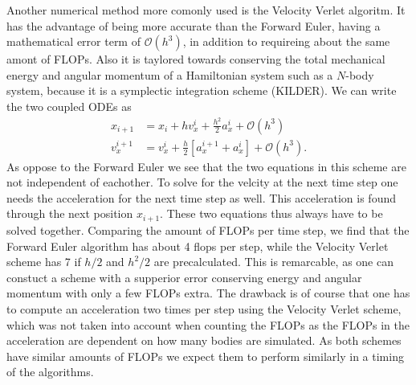 \documentclass[twocolumn]{aastex62}
\begin{document}
Another numerical method more comonly used is the Velocity Verlet algoritm. It
has the advantage of being more accurate than the Forward Euler, having a
mathematical error term of $\mathcal{O}(h^3)$, in addition to requireing about
the same amont of FLOPs. Also it is taylored towards conserving the total
mechanical energy and angular momentum of a Hamiltonian system such as a
$N$-body system, because it is a symplectic integration scheme (KILDER). We can write the
two coupled ODEs as 
\begin{align}
    x_{i+1} &= x_i + hv_x^i + \frac{h^2}{2}a_x^i + \mathcal{O}(h^3)\\
    v_x^{i+1} &= v_x^i + \frac{h}{2}[a_x^{i+1} + a_x^i] + \mathcal{O}(h^3).
\end{align}
As oppose to the Forward Euler we see that the two equations in this scheme are
not independent of eachother. To solve for the velcity at the next time step one
needs the acceleration for the next time step as well. This acceleration is
found through the next position $x_{i+1}$. These two equations thus always have
to be solved together. Comparing the amount of FLOPs per time step, we find that
the Forward Euler algorithm has about 4 flops per step, while the Velocity
Verlet scheme has 7 if $h/2$ and $h^2/2$ are precalculated. This is remarcable,
as one can constuct a scheme with a supperior error conserving energy and
angular momentum with only a few FLOPs extra. The drawback is of course that one
has to compute an acceleration two times per step using the Velocity Verlet
scheme, which was not taken into account when counting the FLOPs as the FLOPs in
the acceleration are dependent on how many bodies are simulated.
As both schemes have similar amounts of FLOPs we expect them to perform
similarly in a timing of the algorithms.
\end{document}
